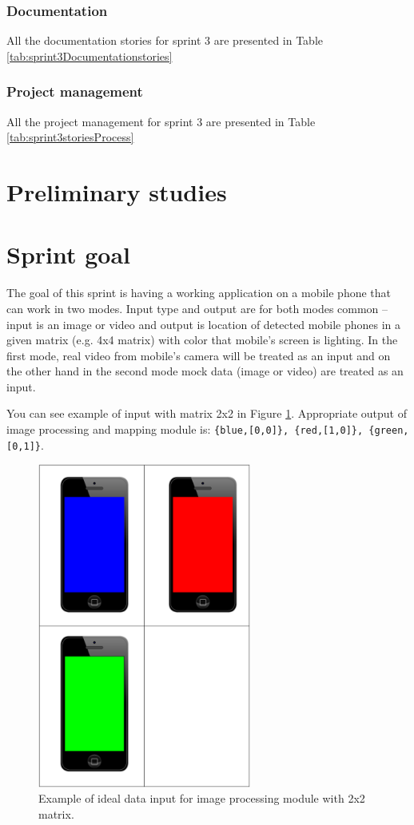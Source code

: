 \subsubsection*{Documentation}
All the documentation stories for sprint 3 are presented in Table \ref{tab:sprint3Documentationstories}

\subsubsection*{Project management}
All the project management for sprint 3 are presented in Table \ref{tab:sprint3storiesProcess}

\section{Preliminary studies}

\section{Sprint goal}
The goal of this sprint is having a working application on a mobile phone that can work in two modes.  
Input type and output are for both modes common -- input is an image or video and output is location of detected mobile phones in a given matrix (e.g. 4x4 matrix) with color that mobile's screen is lighting.
In the first mode, real video from mobile's camera will be treated as an input and on the other hand in the second mode mock data (image or video) are treated as an input.

You can see example of input with matrix 2x2 in Figure \ref{img:sprint3_goal}. Appropriate output of image processing and mapping module is: \texttt{\{blue,[0,0]\}, \{red,[1,0]\}, \{green,[0,1]\}}.

\begin{figure}[H]
	\centering
		\includegraphics[width=7cm]{sprint3/sprint3_goal.pdf}
	\caption{Example of ideal data input for image processing module with 2x2 matrix.}
	\label{img:sprint3_goal}
\end{figure}


